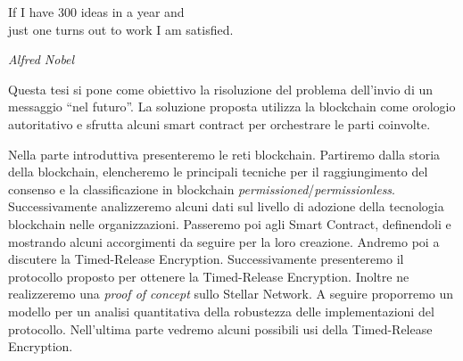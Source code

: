 \documentclass[12pt,twoside]{toptesi}
\begin{document}

\paginavuota




\frontmatter



\begin{flushright}
	\noindent
	If I have 300 ideas in a year and
	\\just one turns out to work I am satisfied.

	\textit{Alfred Nobel}
\end{flushright}
\paginavuota


\sommario
Questa tesi si pone come obiettivo la risoluzione del problema
dell'invio di un messaggio ``nel futuro''. La soluzione proposta
utilizza la blockchain come orologio autoritativo e sfrutta alcuni
smart contract per orchestrare le parti coinvolte.

Nella parte introduttiva presenteremo le reti blockchain.
Partiremo dalla storia della blockchain, elencheremo le principali tecniche per il
raggiungimento del consenso e la classificazione in blockchain
\textit{permissioned}/\textit{permissionless}. Successivamente analizzeremo alcuni dati
sul livello di adozione della tecnologia blockchain nelle organizzazioni.
Passeremo poi agli Smart Contract, definendoli e mostrando alcuni accorgimenti
da seguire per la loro creazione. Andremo poi a discutere la Timed-Release Encryption.
Successivamente presenteremo il protocollo proposto per ottenere la Timed-Release Encryption.
Inoltre ne realizzeremo una \textit{proof of concept} sullo Stellar Network.
A seguire proporremo un modello per un analisi quantitativa della robustezza
delle implementazioni del protocollo.
Nell'ultima parte vedremo alcuni possibili usi della Timed-Release Encryption.
\paginavuota
\end{document}
